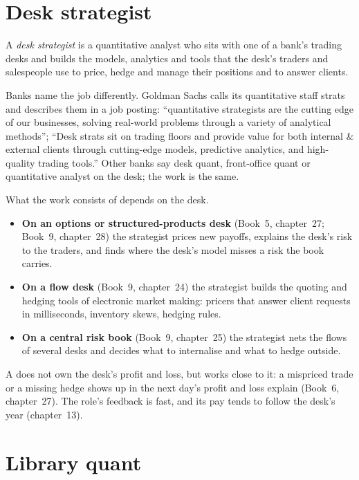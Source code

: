 \section{Desk strategist}

\begin{definition}\label{def:in:bank-quant:strat}
A \emph{desk strategist} is a quantitative analyst who sits with one of a bank's trading desks and
builds the models, analytics and tools that the desk's traders and salespeople use to price, hedge and manage their
positions and to answer clients.
\end{definition}

Banks name the job differently. Goldman Sachs calls its quantitative staff strats and describes them in a job posting:
``quantitative strategists are the cutting edge of our businesses, solving real-world problems through a variety of
analytical methods''; ``Desk strats sit on trading floors and provide value for both internal \& external clients through
cutting-edge models, predictive analytics, and high-quality trading tools.'' Other banks say desk quant, front-office
quant or quantitative analyst on the desk; the work is the same.

What the work consists of depends on the desk.
\begin{itemize}
\item \textbf{On an options or structured-products desk} (Book~5, chapter~27; Book~9, chapter~28) the strategist prices
new payoffs, explains the desk's risk to the traders, and finds where the desk's model misses a risk the book carries.
\item \textbf{On a flow desk} (Book~9, chapter~24) the strategist builds the quoting and hedging tools of electronic market
making: pricers that answer client requests in milliseconds, inventory skews, hedging rules.
\item \textbf{On a central risk book} (Book~9, chapter~25) the strategist nets the flows of several desks and decides what
to internalise and what to hedge outside.
\end{itemize}
A  does not own the desk's profit and loss, but works close to it: a mispriced trade or a missing hedge
shows up in the next day's profit and loss explain (Book~6, chapter~27). The role's feedback is fast, and its pay tends
to follow the desk's year (chapter~13).

\section{Library quant}

